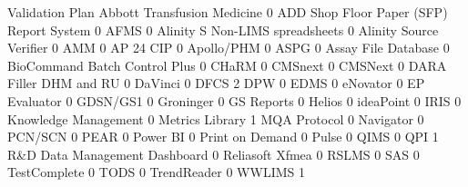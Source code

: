 \documentclass{article}
\begin{document}
\begin{Schunk}
\begin{Soutput}
                                           Validation Plan
  Abbott Transfusion Medicine                            0
  ADD Shop Floor Paper (SFP) Report System               0
  AFMS                                                   0
  Alinity S Non-LIMS spreadsheets                        0
  Alinity Source Verifier                                0
  AMM                                                    0
  AP 24 CIP                                              0
  Apollo/PHM                                             0
  ASPG                                                   0
  Assay File Database                                    0
  BioCommand Batch Control Plus                          0
  CHaRM                                                  0
  CMSnext                                                0
  CMSNext                                                0
  DARA Filler DHM and RU                                 0
  DaVinci                                                0
  DFCS                                                   2
  DPW                                                    0
  EDMS                                                   0
  eNovator                                               0
  EP Evaluator                                           0
  GDSN/GS1                                               0
  Groninger                                              0
  GS Reports                                             0
  Helios                                                 0
  ideaPoint                                              0
  IRIS                                                   0
  Knowledge Management                                   0
  Metrics Library                                        1
  MQA Protocol                                           0
  Navigator                                              0
  PCN/SCN                                                0
  PEAR                                                   0
  Power BI                                               0
  Print on Demand                                        0
  Pulse                                                  0
  QIMS                                                   0
  QPI                                                    1
  R&D Data Management Dashboard                          0
  Reliasoft Xfmea                                        0
  RSLMS                                                  0
  SAS                                                    0
  TestComplete                                           0
  TODS                                                   0
  TrendReader                                            0
  WWLIMS                                                 1
\end{Soutput}
\end{Schunk}
\end{document}
